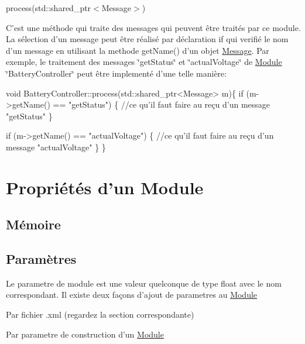 \begin{DoxyItemize}
\item process(std\-::shared\-\_\-ptr$<$\-Message$>$)

C'est une méthode qui traite des messages qui peuvent être traités par ce module. La sélection d'un message peut être réalisé par déclaration {\ttfamily if} qui verifié le nom d'un message en utilisant la methode {\ttfamily get\-Name()} d'un objet \hyperlink{classMessage}{Message}. Par exemple, le traitement des messages \char`\"{}get\-Status\char`\"{} et \char`\"{}actual\-Voltage\char`\"{} de \hyperlink{classModule}{Module} \char`\"{}\-Battery\-Controller\char`\"{} peut être implementé d'une telle manière\-:


\begin{DoxyCode}
\textcolor{keywordtype}{void} BatteryController::process(std::shared\_ptr<Message> m)\{
    \textcolor{keywordflow}{if} (m->getName() == \textcolor{stringliteral}{"getStatus"}) \{
       \textcolor{comment}{//ce qu'il faut faire au reçu d'un message "getStatus"}
    \}

    \textcolor{keywordflow}{if} (m->getName() == \textcolor{stringliteral}{"actualVoltage"}) \{
        \textcolor{comment}{//ce qu'il faut faire au reçu d'un message "actualVoltage"}
    \}
\}
\end{DoxyCode}

\end{DoxyItemize}\hypertarget{docModule_properties}{}\section{Propriétés d'un Module}\label{docModule_properties}
\hypertarget{docModule_memory}{}\subsection{Mémoire}\label{docModule_memory}
\hypertarget{docModule_parameters}{}\subsection{Paramètres}\label{docModule_parameters}
Le parametre de module est une valeur quelconque de type float avec le nom correspondant. Il existe deux façons d'ajout de parametres au \hyperlink{classModule}{Module}
\begin{DoxyItemize}
\item Par fichier .xml (regardez la section correspondante)
\item Par parametre de construction d'un \hyperlink{classModule}{Module}
\end{DoxyItemize}


